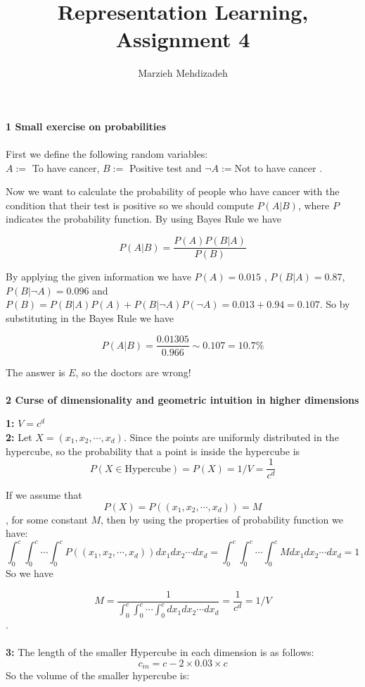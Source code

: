 \documentclass[12pt,english]{amsart}
\title{Representation Learning, Assignment 4}
\author{Marzieh Mehdizadeh}
\date{}
\theoremstyle{definition}
\begin{document}
\maketitle

\textbf{1 Small exercise on probabilities}\\\\

First we define the following random variables:\\
$A:=$ To have cancer, $B:=$ Positive test and $\neg A:= $Not to have cancer .

Now we want to calculate the probability of people who have cancer with the condition that their test is positive so we should compute $P(A|B)$, where $P$ indicates the probability function. By using Bayes Rule we have

$$P(A|B)= \frac{P(A) P(B|A)}{P(B)}$$

By applying the given information we have
$P(A)= 0.015$ , $P(B|A)=0.87$, $P(B|\neg A)= 0.096$ and 
 $P(B)= P(B|A)P(A)+P(B| \neg A)P(\neg A)= 0.013+0.94= 0.107 $. So by substituting in the Bayes Rule we have
 
 $$ P(A|B)= \frac{0.01305}{0.966} \sim 0.107= 10.7 \%$$
 
The answer is $E$, so the doctors are wrong! \\\\

\textbf{2 Curse of dimensionality and geometric intuition
in higher dimensions}


\textbf{1:} $V= c^d$\\

\textbf{2:} Let $X=(x_1, x_2, \cdots, x_d)$. Since the points are uniformly distributed in the hypercube, so the probability that a point is inside the hypercube is $$P(X\in \text{Hypercube})=P(X)=1/V= \frac{1}{c^d}$$

If we assume that $$P(X)= P((x_1, x_2,\cdots, x_d))= M $$, for some constant $M$, then by using the properties of probability function we have:
$$\int_{0}^{c}\int_{0}^{c}\cdots \int_{0}^{c} P((x_1, x_2,\cdots, x_d)) dx_1 dx_2 \cdots dx_d= \int_{0}^{c}\int_{0}^{c}\cdots \int_{0}^{c} M dx_1 dx_2 \cdots dx_d=1$$
So we have

$$M= \frac{1}{\int_{0}^{c}\int_{0}^{c}\cdots \int_{0}^{c}  dx_1 dx_2 \cdots dx_d} = \frac{1}{c^d} = 1/V$$.\\\\
\textbf{3:}  The length of the smaller Hypercube in each dimension is as follows:
$$c_{in}  = c- 2\times 0.03 \times c$$ 
So the volume of the smaller hypercube is:
\end{document}
